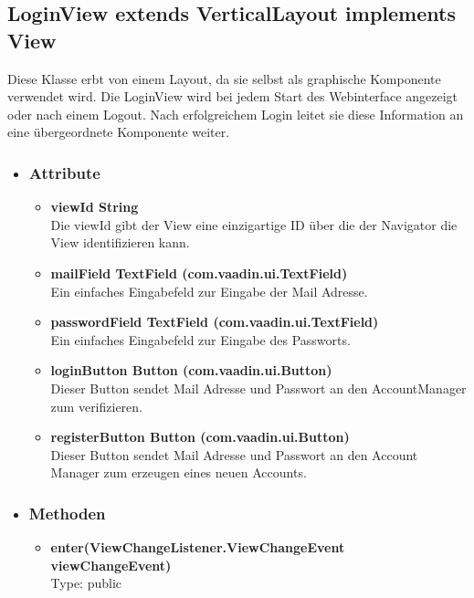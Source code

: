 \newpage
\subsection{LoginView extends VerticalLayout implements View}
Diese Klasse erbt von einem Layout, da sie selbst als graphische Komponente verwendet wird. Die LoginView wird bei jedem Start des Webinterface angezeigt oder nach einem Logout. Nach erfolgreichem Login leitet sie diese Information an eine übergeordnete Komponente weiter.

\begin{itemize}
\item \subsubsection{Attribute}
\begin{itemize}
\item \textbf{viewId String} \hfill\\ 
Die viewId gibt der View eine einzigartige ID über die der Navigator die View identifizieren kann.

\item \textbf{mailField TextField (com.vaadin.ui.TextField)} \hfill\\ 
Ein einfaches Eingabefeld zur Eingabe der Mail Adresse.

\item \textbf{passwordField TextField (com.vaadin.ui.TextField)} \hfill\\
Ein einfaches Eingabefeld zur Eingabe des Passworts.

\item \textbf{loginButton Button (com.vaadin.ui.Button)} \hfill\\
Dieser Button sendet Mail Adresse und Passwort an den AccountManager zum verifizieren.

\item \textbf{registerButton Button (com.vaadin.ui.Button)} \hfill\\
Dieser Button sendet Mail Adresse und Passwort an den Account Manager zum erzeugen eines neuen Accounts.

\end{itemize}

\item \subsubsection{Methoden}
\begin{itemize}
\item \textbf{enter(ViewChangeListener.ViewChangeEvent viewChangeEvent)}\hfill\\
Type: public


\end{itemize}
\end{itemize}
